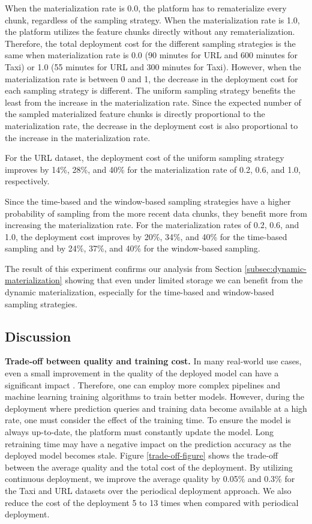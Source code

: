 When the materialization rate is 0.0, the platform has to rematerialize every chunk, regardless of the sampling strategy.
When the materialization rate is 1.0, the platform utilizes the feature chunks directly without any rematerialization.
Therefore, the total deployment cost for the different sampling strategies is the same when materialization rate is 0.0 (90 minutes for URL and 600 minutes for Taxi) or 1.0 (55 minutes for URL and 300 minutes for Taxi).
However, when the materialization rate is between 0 and 1, the decrease in the deployment cost for each sampling strategy is different.
The uniform sampling strategy benefits the least from the increase in the materialization rate.
Since the expected number of the sampled materialized feature chunks is directly proportional to the materialization rate, the decrease in the deployment cost is also proportional to the increase in the materialization rate. 

For the URL dataset, the deployment cost of the uniform sampling strategy improves by 14\%, 28\%, and 40\% for the materialization rate of 0.2, 0.6, and 1.0, respectively.

Since the time-based and the window-based sampling strategies have a higher probability of sampling from the more recent data chunks, they benefit more from increasing the materialization rate.
For the materialization rates of 0.2, 0.6, and 1.0, the deployment cost improves by 20\%, 34\%, and 40\% for the time-based sampling and by 24\%, 37\%, and 40\% for the window-based sampling.

The result of this experiment confirms our analysis from Section \ref{subsec:dynamic-materialization} showing that even under limited storage we can benefit from the dynamic materialization, especially for the time-based and window-based sampling strategies.
\subsection{Discussion} \label{subsec:discussion}
\textbf{Trade-off between quality and training cost.}
In many real-world use cases, even a small improvement in the quality of the deployed model can have a significant impact  \cite{ling2017model}.
Therefore, one can employ more complex pipelines and machine learning training algorithms to train better models.
However, during the deployment where prediction queries and training data become available at a high rate, one must consider the effect of the training time.
To ensure the model is always up-to-date, the platform must constantly update the model.
Long retraining time may have a negative impact on the prediction accuracy as the deployed model becomes stale.
Figure \ref{trade-off-figure} shows the trade-off between the average quality and the total cost of the deployment.
By utilizing continuous deployment, we improve the average quality by 0.05\% and 0.3\% for the Taxi and URL datasets over the periodical deployment approach.
We also reduce the cost of the deployment 5 to 13 times when compared with periodical deployment.

